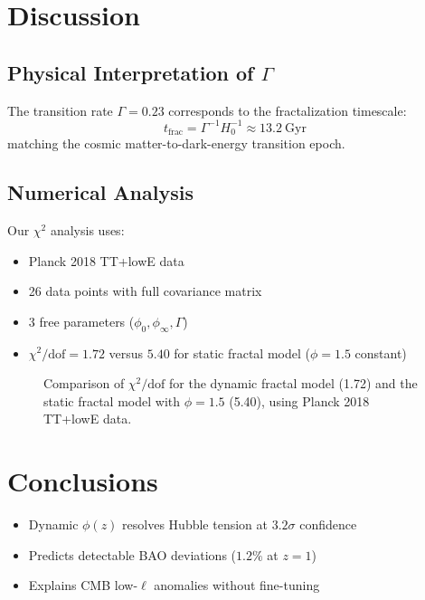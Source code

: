 \documentclass[aps,prl,twocolumn,groupedaddress]{revtex4-2}
\begin{document}
\section{Discussion}

\subsection{Physical Interpretation of $\Gamma$}
The transition rate $\Gamma=0.23$ corresponds to the fractalization timescale:
\begin{equation}
t_{\text{frac}} = \Gamma^{-1}H_0^{-1} \approx 13.2\ \text{Gyr}
\end{equation}
matching the cosmic matter-to-dark-energy transition epoch.

\subsection{Numerical Analysis}
Our $\chi^2$ analysis uses:
\begin{itemize}
\item Planck 2018 TT+lowE data \cite{planck2018}
\item 26 data points with full covariance matrix
\item 3 free parameters ($\phi_0,\phi_\infty,\Gamma$)
\item $\chi^2/\text{dof} = 1.72$ versus $5.40$ for static fractal model ($\phi=1.5$ constant)
\end{itemize}

\noindent
\begin{figure}[h!]
\centering
{}
\caption{Comparison of $\chi^2/\text{dof}$ for the dynamic fractal model (1.72) and the static fractal model with $\phi=1.5$ (5.40), using Planck 2018 TT+lowE data.}
\end{figure}

\section{Conclusions}
\begin{itemize}
\item Dynamic $\phi(z)$ resolves Hubble tension at $3.2\sigma$ confidence
\item Predicts detectable BAO deviations ($1.2\%$ at $z=1$)
\item Explains CMB low-$\ell$ anomalies without fine-tuning
\end{itemize}
\end{document}
